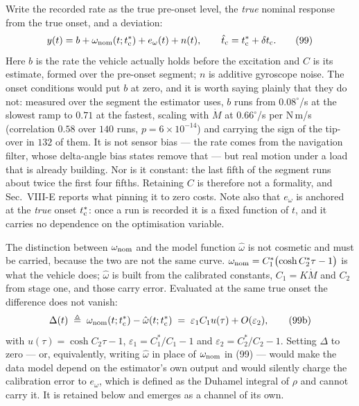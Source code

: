 \documentclass[10pt]{article}
\newcommand{\tc}{t_{\rm c}}
\newcommand{\tcs}{t_{\rm c}^{*}}
\begin{document}
Write the recorded rate as the true pre-onset level, the \emph{true}
nominal response from the true onset, and a deviation:
\begin{equation}
  y(t) = b + \omega_{\rm nom}(t;\tcs) + e_\omega(t) + n(t),
  \qquad
  \hat\tc = \tcs + \delta \tc .
  \tag{99}
\end{equation}
Here $b$ is the rate the vehicle actually holds before the excitation
and $C$ is its estimate, formed over the pre-onset segment; $n$ is
additive gyroscope noise. The onset conditions would put $b$ at zero,
and it is worth saying plainly that they do not: measured over the
segment the estimator uses, $b$ runs from $0.08^\circ$/s at the slowest
ramp to $0.71$ at the fastest, scaling with $\dot M$ at $0.66^\circ$/s
per N\,m/s (correlation $0.58$ over $140$ runs, $p = 6\times10^{-14}$)
and carrying the sign of the tip-over in $132$ of them. It is not
sensor bias --- the rate comes from the navigation filter, whose
delta-angle bias states remove that --- but real motion under a load
that is already building. Nor is it constant: the last fifth of the
segment runs about twice the first four fifths. Retaining $C$ is
therefore not a formality, and Sec.~VIII-E reports what pinning it to
zero costs. Note also that $e_\omega$ is anchored at the
\emph{true} onset $\tcs$: once a run is recorded it is a fixed function
of $t$, and it carries no dependence on the optimisation variable.

The distinction between $\omega_{\rm nom}$ and the model function
$\hat\omega$ is not cosmetic and must be carried, because the two are
not the same curve. $\omega_{\rm nom} = C_1^{*}\bigl(\cosh C_2^{*}\tau
- 1\bigr)$ is what the vehicle does; $\hat\omega$ is built from the
calibrated constants, $C_1 = K\dot M$ and $C_2$ from stage one, and
those carry error. Evaluated at the same true onset the difference does
not vanish:
\begin{equation}
  \Delta(t) \;\triangleq\;
  \omega_{\rm nom}(t;\tcs) - \hat\omega(t;\tcs)
  \;=\; \varepsilon_1 C_1 u(\tau) + O(\varepsilon_2),
  \tag{99b}
\end{equation}
with $u(\tau) = \cosh C_2\tau - 1$, $\varepsilon_1 = C_1^{*}/C_1 - 1$
and $\varepsilon_2 = C_2^{*}/C_2 - 1$. Setting $\Delta$ to zero --- or,
equivalently, writing $\hat\omega$ in place of $\omega_{\rm nom}$ in
(99) --- would make the data model depend on the estimator's own output
and would silently charge the calibration error to $e_\omega$, which is
defined as the Duhamel integral of $\rho$ and cannot carry it. It is
retained below and emerges as a channel of its own.
\end{document}
